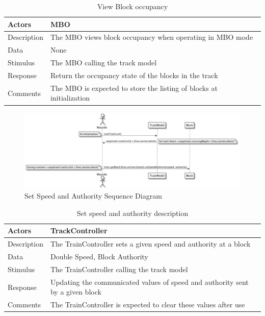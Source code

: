 \documentclass[]{article}
\begin{document}
\begin{table}[H]
	\centering
	\caption{View Block occupancy}
	\begin{tabular}{|l|l|}
		\hline
		Actors & \parbox[t]{10cm}{MBO} \\ \hline
		Description & \parbox[t]{10cm}{The MBO views block occupancy when operating in MBO mode} \\ \hline
		Data &  \parbox[t]{10cm}{None} \\ \hline
		Stimulus &  \parbox[t]{10cm}{The MBO calling the track model} \\ \hline
		Response & \parbox[t]{10cm}{Return the occupancy state of the blocks in the track}\\ \hline
		Comments & \parbox[t]{10cm}{The MBO is expected to store the listing of blocks at initialization}  \\ \hline
	\end{tabular}
\end{table}

\begin{figure}[H]
	\centering
	\includegraphics[width=\textwidth]{setSpeedAuthority.png}
	\caption{Set Speed and Authority Sequence Diagram}
\end{figure}
\begin{table}[H]
	\centering
	\caption{Set speed and authority description}
	\begin{tabular}{|l|l|}
		\hline
		Actors & \parbox[t]{10cm}{TrackController} \\ \hline
		Description & \parbox[t]{10cm}{The TrainController sets a given speed and authority at a block} \\ \hline
		Data &  \parbox[t]{10cm}{Double Speed, Block Authority} \\ \hline
		Stimulus &  \parbox[t]{10cm}{The TrainController calling the track model} \\ \hline
		Response & \parbox[t]{10cm}{Updating the communicated values of speed and authority sent by a given block}\\ \hline
		Comments & \parbox[t]{10cm}{The TrainController is expected to clear these values after use}  \\ \hline
	\end{tabular}
\end{table}
\end{document}
